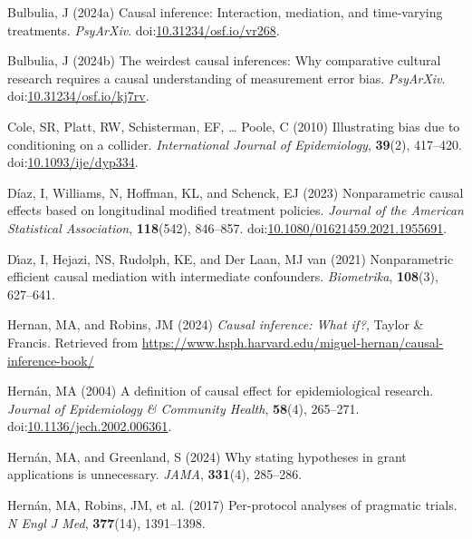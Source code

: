 \documentclass[
  single column]{article}
\newlength{\cslhangindent}
\newenvironment{CSLReferences}[2] %
 {\begin{list}{}{%
  \setlength{\itemindent}{0pt}
  \setlength{\leftmargin}{0pt}
  \setlength{\parsep}{0pt}
  \ifodd #1
   \setlength{\leftmargin}{\cslhangindent}
   \setlength{\itemindent}{-1\cslhangindent}
  \fi
  \setlength{\itemsep}{#2\baselineskip}}}
 {\end{list}}
\begin{document}
\label{refs}
\begin{CSLReferences}{1}{0}
Bulbulia, J (2024a) Causal inference: Interaction, mediation, and
time-varying treatments. \emph{PsyArXiv}.
doi:\href{https://doi.org/10.31234/osf.io/vr268}{10.31234/osf.io/vr268}.

Bulbulia, J (2024b) The weirdest causal inferences: Why comparative
cultural research requires a causal understanding of measurement error
bias. \emph{PsyArXiv}.
doi:\href{https://doi.org/10.31234/osf.io/kj7rv}{10.31234/osf.io/kj7rv}.

Cole, SR, Platt, RW, Schisterman, EF, \ldots{} Poole, C (2010)
Illustrating bias due to conditioning on a collider. \emph{International
Journal of Epidemiology}, \textbf{39}(2), 417--420.
doi:\href{https://doi.org/10.1093/ije/dyp334}{10.1093/ije/dyp334}.

Díaz, I, Williams, N, Hoffman, KL, and Schenck, EJ (2023) Nonparametric
causal effects based on longitudinal modified treatment policies.
\emph{Journal of the American Statistical Association},
\textbf{118}(542), 846--857.
doi:\href{https://doi.org/10.1080/01621459.2021.1955691}{10.1080/01621459.2021.1955691}.

Dı́az, I, Hejazi, NS, Rudolph, KE, and Der Laan, MJ van (2021)
Nonparametric efficient causal mediation with intermediate confounders.
\emph{Biometrika}, \textbf{108}(3), 627--641.

Hernan, MA, and Robins, JM (2024) \emph{Causal inference: What if?},
Taylor \& Francis. Retrieved from
\url{https://www.hsph.harvard.edu/miguel-hernan/causal-inference-book/}

Hernán, MA (2004) A definition of causal effect for epidemiological
research. \emph{Journal of Epidemiology \& Community Health},
\textbf{58}(4), 265--271.
doi:\href{https://doi.org/10.1136/jech.2002.006361}{10.1136/jech.2002.006361}.

Hernán, MA, and Greenland, S (2024) Why stating hypotheses in grant
applications is unnecessary. \emph{JAMA}, \textbf{331}(4), 285--286.

Hernán, MA, Robins, JM, et al. (2017) Per-protocol analyses of pragmatic
trials. \emph{N Engl J Med}, \textbf{377}(14), 1391--1398.


\end{CSLReferences}
\end{document}
